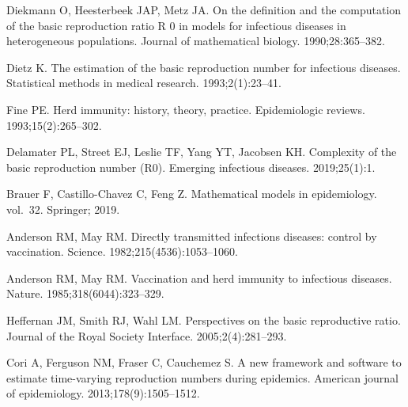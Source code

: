 \documentclass[10pt,letterpaper]{article}
\begin{document}
%
%
% 
\begin{thebibliography}{10}

  Diekmann O, Heesterbeek JAP, Metz JA.
  \newblock On the definition and the computation of the basic reproduction ratio
    R 0 in models for infectious diseases in heterogeneous populations.
  \newblock Journal of mathematical biology. 1990;28:365--382.
  
  Dietz K.
  \newblock The estimation of the basic reproduction number for infectious
    diseases.
  \newblock Statistical methods in medical research. 1993;2(1):23--41.
  
  Fine PE.
  \newblock Herd immunity: history, theory, practice.
  \newblock Epidemiologic reviews. 1993;15(2):265--302.
  
  Delamater PL, Street EJ, Leslie TF, Yang YT, Jacobsen KH.
  \newblock Complexity of the basic reproduction number (R0).
  \newblock Emerging infectious diseases. 2019;25(1):1.
  
  Brauer F, Castillo-Chavez C, Feng Z.
  \newblock Mathematical models in epidemiology. vol.~32.
  \newblock Springer; 2019.
  
  Anderson RM, May RM.
  \newblock Directly transmitted infections diseases: control by vaccination.
  \newblock Science. 1982;215(4536):1053--1060.
  
  Anderson RM, May RM.
  \newblock Vaccination and herd immunity to infectious diseases.
  \newblock Nature. 1985;318(6044):323--329.
  
  Heffernan JM, Smith RJ, Wahl LM.
  \newblock Perspectives on the basic reproductive ratio.
  \newblock Journal of the Royal Society Interface. 2005;2(4):281--293.
  
  Cori A, Ferguson NM, Fraser C, Cauchemez S.
  \newblock A new framework and software to estimate time-varying reproduction
    numbers during epidemics.
  \newblock American journal of epidemiology. 2013;178(9):1505--1512.
  

\end{thebibliography}
\end{document}
